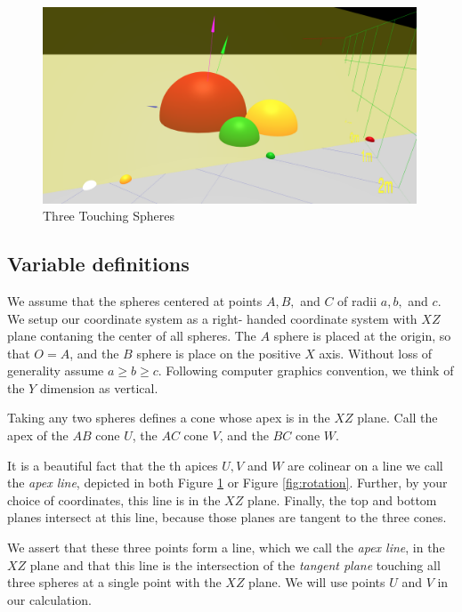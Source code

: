 \documentclass{article}
\begin{document}
\begin{figure}
     \centering
     \includegraphics[width=0.99\textwidth]{figures/StandardThreeSphereDiagram.png}
     \caption{Three Touching Spheres}
  \label{fig:fixed}
\end{figure}

\subsection{Variable definitions}

We assume that the spheres centered at points $A,B,$ and $C$
of radii $a,b,$ and $c$. We setup our coordinate system as a right-
handed coordinate system with $XZ$ plane contaning the center of all spheres.
The $A$ sphere is placed at the origin, so that $O = A$, and the $B$ sphere
is place on the positive $X$ axis. Without loss of generality assume $a \geq b \geq c$.
Following computer graphics convention, we think of the $Y$ dimension as vertical.

Taking any two spheres defines a cone whose apex is in the $XZ$ plane.
Call the apex of the $AB$ cone $U$, the $AC$ cone $V$, and the $BC$ cone $W$.

It is a beautiful fact that the th apices $U,V$ and $W$ are colinear
on a line we call the {\em apex line}, depicted in both Figure \ref{fig:fixed}
or Figure \ref{fig:rotation}.
Further, by your choice of coordinates,
this line is in the $XZ$ plane. Finally, the top and bottom planes
intersect at this line, because those planes are tangent to the three cones.

We assert that these three points form a line, which we call the {\em apex line}, in the $XZ$ plane and that this
line is the intersection of the {\em tangent plane} touching all three spheres at a single point
with the $XZ$ plane. We will use points $U$ and $V$ in our calculation.
\end{document}
